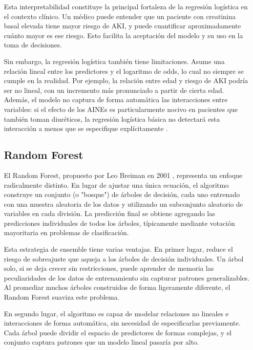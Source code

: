 \documentclass[12pt, a4paper, oneside]{report}
\begin{document}
Esta interpretabilidad constituye la principal fortaleza de la regresión logística en el contexto clínico. Un médico puede entender que un paciente con creatinina basal elevada tiene mayor riesgo de AKI, y puede cuantificar aproximadamente cuánto mayor es ese riesgo. Esto facilita la aceptación del modelo y su uso en la toma de decisiones.

Sin embargo, la regresión logística también tiene limitaciones. Asume una relación lineal entre los predictores y el logaritmo de odds, lo cual no siempre se cumple en la realidad. Por ejemplo, la relación entre edad y riesgo de AKI podría ser no lineal, con un incremento más pronunciado a partir de cierta edad. Además, el modelo no captura de forma automática las interacciones entre variables: si el efecto de los AINEs es particularmente nocivo en pacientes que también toman diuréticos, la regresión logística básica no detectará esta interacción a menos que se especifique explícitamente \parencite{hosmer2013logistic}.

\subsection{Random Forest}

El Random Forest, propuesto por Leo Breiman en 2001 \parencite{breiman2001rf}, representa un enfoque radicalmente distinto. En lugar de ajustar una única ecuación, el algoritmo construye un conjunto (o "bosque") de árboles de decisión, cada uno entrenado con una muestra aleatoria de los datos y utilizando un subconjunto aleatorio de variables en cada división. La predicción final se obtiene agregando las predicciones individuales de todos los árboles, típicamente mediante votación mayoritaria en problemas de clasificación.

Esta estrategia de ensemble tiene varias ventajas. En primer lugar, reduce el riesgo de sobreajuste que aqueja a los árboles de decisión individuales. Un árbol solo, si se deja crecer sin restricciones, puede aprender de memoria las peculiaridades de los datos de entrenamiento sin capturar patrones generalizables. Al promediar muchos árboles construidos de forma ligeramente diferente, el Random Forest suaviza este problema.

En segundo lugar, el algoritmo es capaz de modelar relaciones no lineales e interacciones de forma automática, sin necesidad de especificarlas previamente. Cada árbol puede dividir el espacio de predictores de formas complejas, y el conjunto captura patrones que un modelo lineal pasaría por alto.
\end{document}
